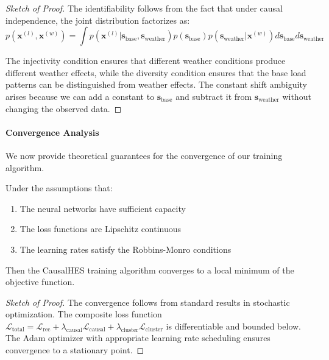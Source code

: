 \documentclass[journal]{IEEEtran}
\begin{document}
\begin{proof}[Sketch of Proof]
The identifiability follows from the fact that under causal independence, the joint distribution factorizes as:
\begin{equation}
p(\mathbf{x}^{(l)}, \mathbf{x}^{(w)}) = \int p(\mathbf{x}^{(l)} | \mathbf{s}_{\text{base}}, \mathbf{s}_{\text{weather}}) p(\mathbf{s}_{\text{base}}) p(\mathbf{s}_{\text{weather}} | \mathbf{x}^{(w)}) d\mathbf{s}_{\text{base}} d\mathbf{s}_{\text{weather}}
\end{equation}

The injectivity condition ensures that different weather conditions produce different weather effects, while the diversity condition ensures that the base load patterns can be distinguished from weather effects. The constant shift ambiguity arises because we can add a constant to $\mathbf{s}_{\text{base}}$ and subtract it from $\mathbf{s}_{\text{weather}}$ without changing the observed data.
\end{proof}

\paragraph{Convergence Analysis}
We now provide theoretical guarantees for the convergence of our training algorithm.

\begin{theorem}
Under the assumptions that:
\begin{enumerate}
    \item The neural networks have sufficient capacity
    \item The loss functions are Lipschitz continuous
    \item The learning rates satisfy the Robbins-Monro conditions
\end{enumerate}
Then the CausalHES training algorithm converges to a local minimum of the objective function.
\end{theorem}

\begin{proof}[Sketch of Proof]
The convergence follows from standard results in stochastic optimization. The composite loss function $\mathcal{L}_{\text{total}} = \mathcal{L}_{\text{rec}} + \lambda_{\text{causal}}\mathcal{L}_{\text{causal}} + \lambda_{\text{cluster}}\mathcal{L}_{\text{cluster}}$ is differentiable and bounded below. The Adam optimizer with appropriate learning rate scheduling ensures convergence to a stationary point.
\end{proof}
\end{document}
